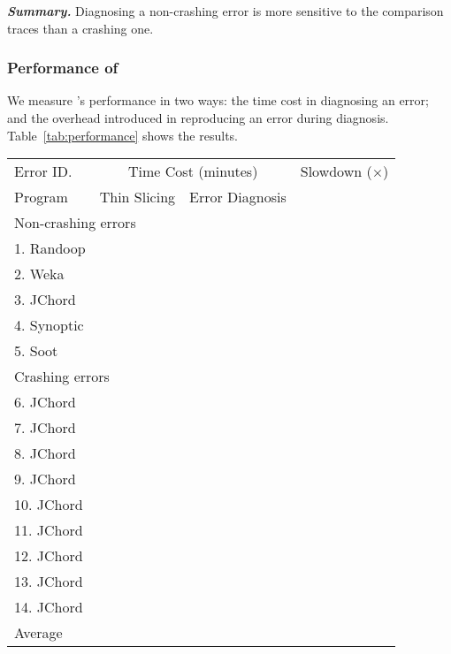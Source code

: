 \vspace{1mm}
\noindent \textbf{\textit{Summary.}} Diagnosing a non-crashing
error is more sensitive to the comparison traces than a crashing one.

\subsubsection{Performance of \ourtool}

We measure \ourtool's performance in two ways: the time cost
in diagnosing an error; and the overhead introduced
in reproducing an error during diagnosis.  Table~\ref{tab:performance}
shows the results.

\begin{table}[t]
\setlength{\tabcolsep}{.44\tabcolsep}
\begin{tabular}{|l|c|c|c|}
\hline
 Error ID. & \multicolumn{2}{|c|}{Time Cost (minutes)} & Slowdown ($\times$)\\
\cline{2-3}
 Program & Thin Slicing & Error Diagnosis &  \\
 \hline
\hline
\multicolumn{4}{|l|}{Non-crashing errors}   \\
 \hline
 1. Randoop &  &  & \\
 2. Weka &  &  & \\
 3. JChord &  &  & \\
 4. Synoptic &  &  & \\
 5. Soot &  &  & \\
\hline
\hline
\multicolumn{4}{|l|}{Crashing errors}   \\
\hline
 6. JChord &  &  &\\
 7. JChord &  &  &\\
 8. JChord &  &  &\\
 9. JChord &  &  &\\
 10. JChord &  &  &\\
 11. JChord &  &  &\\
 12. JChord &  &  &\\
 13. JChord &  &  &\\
 14. JChord &  &  &\\
\hline
\hline
Average & & &\\
\hline
\end{tabular}

\end{table}

